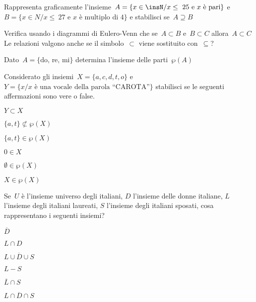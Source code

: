 \begin{esercizio}
\label{ese:7.68}
Rappresenta graficamente l'insieme~$A=\{x\in \insN/x\le~25 \text{ e } x\text{ è 
pari}\}$ e
$B=\{x\in N/x\le~27\text{ e } x\text{ è multiplo di~4}\}$ e stabilisci 
se~$A\supseteq B$
\end{esercizio}

\begin{esercizio}
\label{ese:7.69}
Verifica usando i diagrammi di Eulero-Venn che se~$A\subset B$ e~$B\subset C$ 
allora~$A\subset C$ Le relazioni valgono
anche se il simbolo~${\subset}$ viene sostituito con~${\subseteq}$?
\end{esercizio}

\begin{esercizio}
\label{ese:7.70}
Dato~$A=\{\text{do, re, mi}\}$ determina l'insieme delle parti~$\wp (A)$
\end{esercizio}

\begin{esercizio}
\label{ese:7.71}
Considerato gli insiemi~$X=\{a,c,d,t,o\}$ e 
$Y=\{x/x\text{ è una vocale della parola ``CAROTA''}\}$
stabilisci se le seguenti affermazioni sono vere o false.

\TabPositions{8cm}
\begin{multicols}{3}
\begin{enumeratea}
\item $Y \subset X$ \hfill \boxV\quad\boxF
\item $\{a,t\}\not\subset \wp (X)$ \hfill \boxV\quad\boxF
\item $\{a,t\}\in \wp (X)$ \hfill \boxV\quad\boxF
\item $0\in X$ \hfill \boxV\quad\boxF
\item $\emptyset \in \wp (X)$ \hfill \boxV\quad\boxF
\item $X\in \wp (X)$ \hfill \boxV\quad\boxF
\end{enumeratea}
\end{multicols}
\end{esercizio}


\begin{esercizio}
\label{ese:7.72}
Se~$U$ è l'insieme universo degli italiani, $D$ l'insieme delle donne italiane,
$L$ l'insieme degli italiani laureati, $S$ l'insieme degli italiani sposati, 
cosa rappresentano
i seguenti insiemi?
\begin{multicols}{3}
\begin{enumeratea}
\item $\overline{D}$
\item $L\cap D$
\item $\overline{{L\cup D\cup S}}$
\item $L-S$
\item $\overline{{L}}\cap S$
\item $\overline{{L\cap D\cap S}}$
\end{enumeratea}
\end{multicols}
\end{esercizio}


